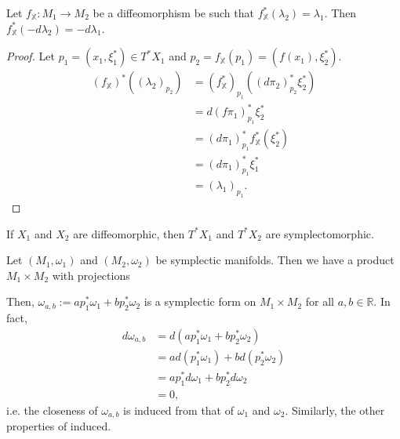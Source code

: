 \documentclass[misc]{subfiles}
\begin{document}
\begin{Prp}[]\label{Prp: Modular forms implies associated 2-forms}
    Let $f_\mathbb{X}:M_1\to M_2$ be a diffeomorphism be such that $f_\mathbb{X}^\ast(\lambda_2)=\lambda_1$. Then $f_\mathbb{X}^\ast(-d\lambda_2) = -d\lambda_1$.

    \begin{proof}
    
        Let $p_1 = (x_1, \xi_1^\ast)\in T^\ast X_1$ and $p_2 = f_\mathbb{X}(p_1) = (f(x_1), \xi_2^\ast)$.
        \begin{align*}
            (f_\mathbb{X})^\ast((\lambda_2)_{p_2}) &= (f_\mathbb{X}^\ast)_{p_1}((d\pi_2)_{p_2}^\ast\xi_2^\ast) \\
                                                   &= d(f\pi_1)_{p_1}^\ast \xi_2^\ast \\
                                                   &= (d\pi_1)^\ast_{p_1} f^\ast_\mathbb{X}(\xi_2^\ast) \\
                                                   &= (d\pi_1)_{p_1}^\ast \xi_1^\ast \\
                                                   &= (\lambda_1)_{p_1}.
        \end{align*}
    \end{proof}
\end{Prp}

\begin{Cor}[]\label{Cor: Diffeomorphism induces symplectomorphism}
    If $X_1$ and $X_2$ are diffeomorphic, then $T^\ast X_1$ and $T^\ast X_2$ are symplectomorphic.
\end{Cor}

\begin{Exp}
    Let $(M_1,\omega_1)$ and $(M_2,\omega_2)$ be symplectic manifolds. Then we have a product $M_1\times M_2$ with projections
    \begin{center}
    \end{center}
    Then, $\omega_{a,b}:= ap_1^\ast\omega_1 + bp_2^\ast\omega_2$ is a symplectic form on $M_1\times M_2$ for all $a,b\in \mathbb{R}$. In fact,
    \begin{align*}
        d\omega_{a,b} &= d(ap_1^\ast\omega_1 + bp_2^\ast\omega_2) \\
                      &= ad(p_1^\ast\omega_1) + bd(p_2^\ast\omega_2) \\
                      &= ap_1^\ast d\omega_1 + bp_2^\ast d\omega_2 \\
                      &= 0,
    \end{align*}
    i.e. the closeness of $\omega_{a,b}$ is induced from that of $\omega_1$ and $\omega_2$. Similarly, the other properties of induced.
\end{Exp}
\end{document}
